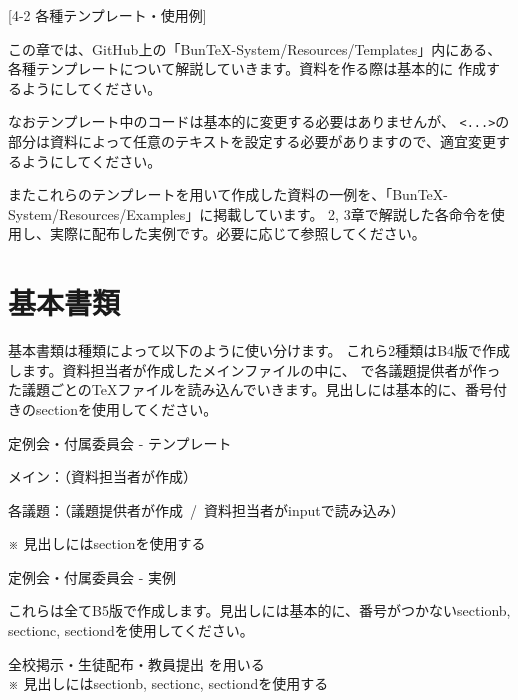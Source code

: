 \newpage
\pagestyle{leaflet}
[4-2 各種テンプレート・使用例]
\begin{multicols*}{2}
この章では、GitHub上の「BunTeX-System/Resources/Templates」内にある、
各種テンプレートについて解説していきます。資料を作る際は基本的に
作成するようにしてください。

なおテンプレート中のコードは基本的に変更する必要はありませんが、
\verb|<...>|の部分は資料によって任意のテキストを設定する必要がありますので、適宜変更するようにしてください。

またこれらのテンプレートを用いて作成した資料の一例を、「BunTeX-System/Resources/Examples」に掲載しています。
2, 3章で解説した各命令を使用し、実際に配布した実例です。必要に応じて参照してください。

\section{基本書類}
基本書類は種類によって以下のように使い分けます。
これら2種類はB4版で作成します。資料担当者が作成したメインファイルの中に、\verb||
で各議題提供者が作った議題ごとの\TeX ファイルを読み込んでいきます。見出しには基本的に、番号付きのsectionを使用してください。
\begin{framebox-simple}{定例会・付属委員会 - テンプレート}
\begin{reitemize}
    \item メイン：（資料担当者が作成）
    \item 各議題：（議題提供者が作成~/~資料担当者がinputで読み込み）
\end{reitemize}
\noindent ※ 見出しにはsectionを使用する
\end{framebox-simple}
\begin{framebox-simple}{定例会・付属委員会 - 実例}
    \begin{reitemize}
        \item {}
    \end{reitemize}
\end{framebox-simple}

これらは全てB5版で作成します。見出しには基本的に、番号がつかないsectionb, sectionc, sectiondを使用してください。
\begin{framebox-simple}{全校掲示・生徒配布・教員提出}
を用いる\\
\noindent ※ 見出しにはsectionb, sectionc, sectiondを使用する
\end{framebox-simple}


\end{multicols*}

